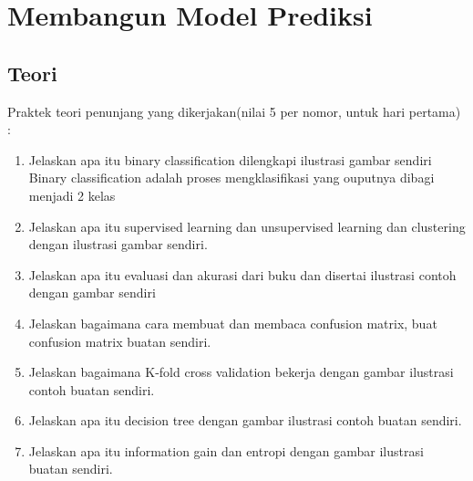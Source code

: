 \chapter{Membangun Model Prediksi}


\section{Teori}
Praktek teori penunjang yang dikerjakan(nilai 5 per nomor, untuk hari pertama) :
\begin{enumerate}
\item
Jelaskan apa itu binary classification dilengkapi ilustrasi gambar sendiri\\
Binary classification adalah proses mengklasifikasi yang ouputnya dibagi menjadi 2 kelas 

\item
Jelaskan apa itu supervised learning dan unsupervised learning dan clustering dengan ilustrasi gambar sendiri.
\item
Jelaskan apa itu evaluasi dan akurasi dari buku dan disertai ilustrasi contoh dengan gambar sendiri
\item
Jelaskan bagaimana cara membuat dan membaca confusion matrix, buat confusion matrix buatan sendiri.
\item
Jelaskan bagaimana K-fold cross validation bekerja dengan gambar ilustrasi contoh buatan sendiri.
\item
Jelaskan apa itu decision tree dengan gambar ilustrasi contoh buatan sendiri.
\item
Jelaskan apa itu information gain dan entropi dengan gambar ilustrasi buatan sendiri.
\end{enumerate}


